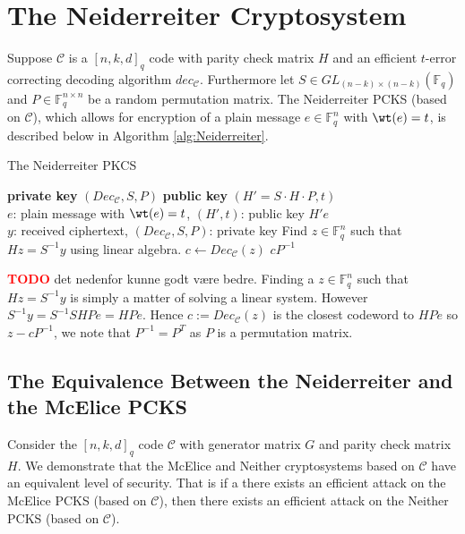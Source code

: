 \section{The Neiderreiter Cryptosystem}

Suppose $\mathcal{C}$ is a $[n, k, d]_q$ code with parity check matrix $H$ and an efficient $t$-error correcting decoding algorithm $dec_{\mathcal{C}}$. Furthermore let $S \in GL_{(n - k) \times (n - k)}(\mathbb{F}_q)$ and $P \in \mathbb{F}_q^{n \times n}$ be a random permutation matrix. The Neiderreiter PCKS (based on $\mathcal{C}$), which allows for encryption of a plain message $e \in \mathbb{F}_q^n$ with $\wt(e) = t$, is described below in Algorithm \ref{alg:Neiderreiter}.

\begin{algorithm}
\caption{The Neiderreiter PKCS}\label{alg:Neiderreiter}
\begin{algorithmic}
  \State \textbf{private key} $(Dec_{\mathcal{C}}, S, P)$
  \State \textbf{public key} $(H' = S \cdot H \cdot P, t)$
  \\
   {$e$: plain message with $\wt(e) = t$, $(H', t)$: public key}
    \State \Return $H'e$
  \EndProcedure \\
   {$y$: received ciphertext, $(Dec_{\mathcal{C}}, S, P)$: private key}
    \State Find $z \in \mathbb{F}_q^n$ such that $Hz = S^{-1}y$ using linear algebra.
    \State $c \gets Dec_{\mathcal{C}}(z)$
    \State \Return $c P^{-1}$
  \EndProcedure
\end{algorithmic}
\end{algorithm}

\textcolor{red}{\textbf{TODO}} det nedenfor kunne godt være bedre.
Finding a $z \in \mathbb{F}_q^{n}$ such that $Hz = S^{-1}y$ is simply a matter of solving a linear system. However $S^{-1}y = S^{-1}SHPe = HPe$. Hence $c := Dec_{\mathcal{C}}(z)$ is the closest codeword to $HPe$ so $z - c P^{-1}$, we note that $P^{-1} = P^T$ as $P$ is a permutation matrix.

\subsection{The Equivalence Between the Neiderreiter and the McElice PCKS}%

Consider the $[n, k, d]_{q}$ code $\mathcal{C}$ with generator matrix $G$ and parity check matrix $H$. We demonstrate that the McElice and Neither cryptosystems based on $\mathcal{C}$ have an equivalent level of security. That is if a there exists an efficient attack on the McElice PCKS (based on $\mathcal{C}$), then there exists an efficient attack on the Neither PCKS (based on $\mathcal{C}$).

